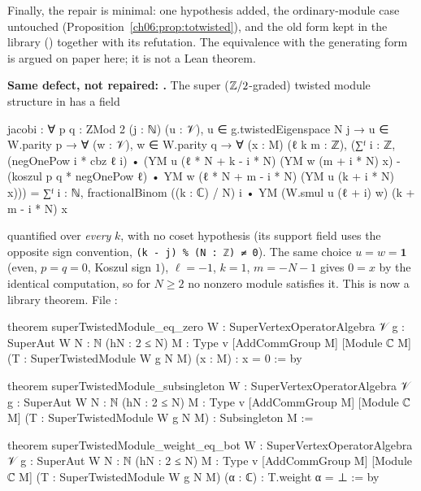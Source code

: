 Finally, the repair is minimal: one hypothesis added, the ordinary-module case untouched
(Proposition~\ref{ch06:prop:totwisted}), and the old form kept in the library
() together with its refutation.  The equivalence with the generating form
is argued on paper here; it is not a Lean theorem.

\begin{warning}
\textbf{Same defect, not repaired: .}  The super (${\mathbb{Z}}/2$-graded) twisted
module structure  in  has a
field
\begin{leancode}
  jacobi : ∀ {p q : ZMod 2} (j : ℕ) (u : 𝒱),
    u ∈ g.twistedEigenspace N j → u ∈ W.parity p →
    ∀ (w : 𝒱), w ∈ W.parity q → ∀ (x : M) (ℓ k m : ℤ),
    (∑ᶠ i : ℤ, (negOnePow i * cbz ℓ i) •
        (YM u (ℓ * N + k - i * N) (YM w (m + i * N) x)
          - (koszul p q * negOnePow ℓ) •
            YM w (ℓ * N + m - i * N) (YM u (k + i * N) x))) =
      ∑ᶠ i : ℕ, fractionalBinom ((k : ℂ) / N) i •
        YM (W.smul u (ℓ + i) w) (k + m - i * N) x
\end{leancode}
quantified over \emph{every} $k$, with no coset hypothesis (its support field uses the opposite
sign convention, \texttt{(k - j) \% (N : ℤ) ≠ 0}).  The same choice $u=w=\mathbf 1$ (even, $p=q=0$,
Koszul sign $1$), $\ell=-1$, $k=1$, $m=-N-1$ gives $0=x$ by the identical computation, so for
$N\ge2$ no nonzero module satisfies it.  This is now a library theorem.  File
:
\begin{leancode}
theorem superTwistedModule_eq_zero {W : SuperVertexOperatorAlgebra 𝒱} {g : SuperAut W}
    {N : ℕ} (hN : 2 ≤ N) {M : Type v} [AddCommGroup M] [Module ℂ M]
    (T : SuperTwistedModule W g N M) (x : M) : x = 0 := by

theorem superTwistedModule_subsingleton {W : SuperVertexOperatorAlgebra 𝒱} {g : SuperAut W}
    {N : ℕ} (hN : 2 ≤ N) {M : Type v} [AddCommGroup M] [Module ℂ M]
    (T : SuperTwistedModule W g N M) : Subsingleton M :=

theorem superTwistedModule_weight_eq_bot {W : SuperVertexOperatorAlgebra 𝒱} {g : SuperAut W}
    {N : ℕ} (hN : 2 ≤ N) {M : Type v} [AddCommGroup M] [Module ℂ M]
    (T : SuperTwistedModule W g N M) (α : ℂ) : T.weight α = ⊥ := by


\end{leancode}
\end{warning}
